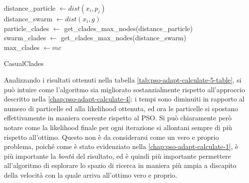 \begin{algorithm}[!h]
    distance\_particle $\gets dist(x_i, p_i)$ \\
    distance\_swarm $\gets dist(x_i, g)$ \\
    particle\_clades $\gets$ get\_clades\_max\_nodes(distance\_particle)\\
    swarm\_clades $\gets$ get\_clades\_max\_nodes(distance\_swarm) \\
    max\_clades $\gets mc$ \\
     
    \caption{CasualClades}
    \label{algo:pso-adapt-calculate-5-algo}
\end{algorithm}
Analizzando i risultati ottenuti nella tabella \autoref{tab:pso-adapt-calculate-5-table}, si può intuire come l'algoritmo sia migliorato sostanzialmente rispetto all'approccio descritto nella \autoref{chap:pso-adapt-calculate-4}: i tempi sono diminuiti in rapporto al numero di particelle ed alla likelihood ottenuta, ed ora le particelle si spostano effettivamente in maniera coerente rispetto al PSO. Si può chiaramente però notare come la likelihood finale per ogni iterazione si allontani sempre di più rispetto all'ottimo. Questo non è da considerarsi come un vero e proprio problema, poiché come è stato evidenziato nella \autoref{chap:pso-adapt-calculate-1}, è più importante la \textit{bontà} del risultato, ed è quindi più importante permettere all'algoritmo di esplorare lo spazio di ricerca in maniera più ampia a discapito della velocità con la quale arriva all'ottimo vero e proprio.

